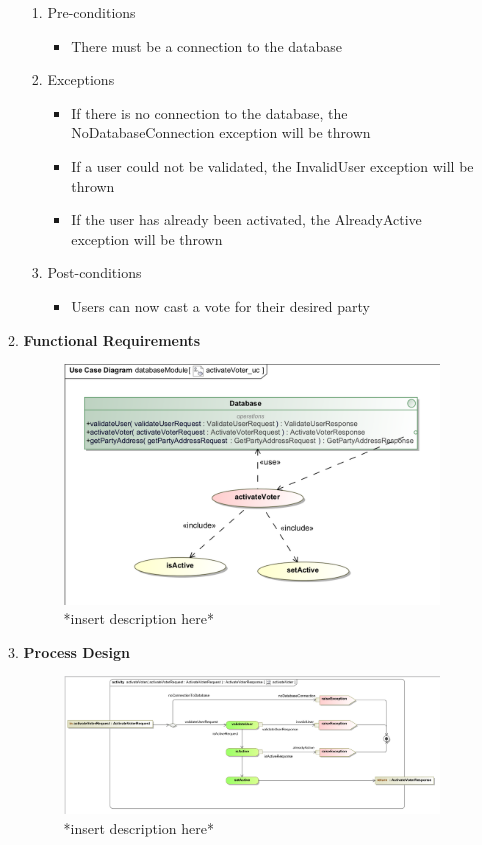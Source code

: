 \begin{enumerate}
\begin{enumerate}
			\begin{enumerate}
				\item Pre-conditions
				\begin{itemize}
					\item There must be a connection to the database
				\end{itemize}
				
				\item Exceptions
				\begin{itemize}
						\item If there is no connection to the database, the NoDatabaseConnection exception will be thrown
						\item If a user could not be validated, the InvalidUser exception will be thrown
						\item If the user has already been activated, the AlreadyActive exception will be thrown
				\end{itemize}
				
				\item Post-conditions
				\begin{itemize}
					\item Users can now cast a vote for their desired party
				\end{itemize}
			\end{enumerate}
			
			\item \textbf{Functional Requirements}
			\begin{figure}[H]
				\centering
				\includegraphics[width=0.75\linewidth]{../Images/Database/UseCases/ActivateVoter_UseCase.png}
				\caption{*insert description here*}
			\end{figure}
			
			\item \textbf{Process Design}
			\begin{figure}[H]
				\centering
				\includegraphics[width=0.75\linewidth]{../Images/Database/Activity/ActivateVoter_Activity.png}
				\caption{*insert description here*}
			\end{figure}
		\end{enumerate}
\end{enumerate}